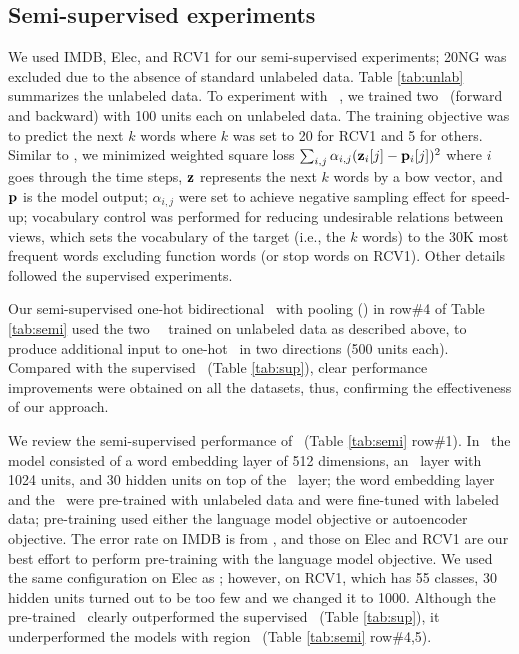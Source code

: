 \documentclass{article}
\begin{document}
\subsection{Semi-supervised experiments}
\label{sec:exp}



We used IMDB, Elec, and RCV1 for our semi-supervised experiments; 
20NG was excluded due to the absence of standard unlabeled data.  
Table \ref{tab:unlab} summarizes the unlabeled data. 
To experiment with \lstm\ \tvEmbs, 
we trained two \lstms\ (forward and backward) with 100 units each on unlabeled data. 
The training objective was 
to predict the next $k$ words where $k$ was set to 20 for RCV1 and 5 for others.  
Similar to \JZb, 
we minimized weighted square loss 
\newcommand{\lossWei}{\alpha}
$\sum_{i,j} \lossWei_{i,j}(\bz_i[j]-\bp_i[j])^2$ 
where $i$ goes through the time steps, 
${\mathbf z}$ represents the next $k$ words by a bow vector, 
and ${\mathbf p}$ is the model output; 
$\lossWei_{i,j}$ were set to achieve negative sampling effect for speed-up; 
vocabulary control was performed 
for reducing undesirable relations between views, which 
sets the vocabulary of the target (i.e., the $k$ words) to the 30K most frequent words 
excluding function words (or stop words on RCV1). 
Other details followed the supervised experiments. 

Our semi-supervised one-hot bidirectional \lstm\ with pooling (\ohBiLstm) 
in row\#4 of Table \ref{tab:semi} used the two \lstm\ \tvEmbs\ 
trained on unlabeled data 
as described above, 
to produce additional input to 
one-hot \lstms\ in two directions (500 units each). 
Compared with the supervised \ohBiLstm\ (Table \ref{tab:sup}), 
clear performance improvements were obtained on all the datasets, 
thus, confirming the effectiveness of 
our approach. 


We review the semi-supervised performance of \wvLstms\ (Table \ref{tab:semi} row\#1). 
In \DLa\ 
the model consisted of a word embedding layer of 
512 dimensions, an \lstm\ layer with 1024 units, and 30 hidden units on top of the \lstm\ layer; 
the word embedding layer and the \lstm\ were pre-trained with unlabeled data and were fine-tuned with labeled data; 
pre-training used 
either the language model objective or autoencoder objective. 
The error rate on IMDB is from \DLa, and those on Elec and RCV1 are our best effort to 
perform pre-training with the language model objective.  We used the same configuration on Elec as \DLa; 
however, on RCV1, which has 55 classes, 
30 hidden units turned out to be too few and we changed it to 1000. 
Although the pre-trained \wvLstm\ clearly outperformed the supervised \wvLstm\ (Table \ref{tab:sup}), 
it underperformed
the models with region \tvEmbs\ (Table \ref{tab:semi} row\#4,5).  
\end{document}
